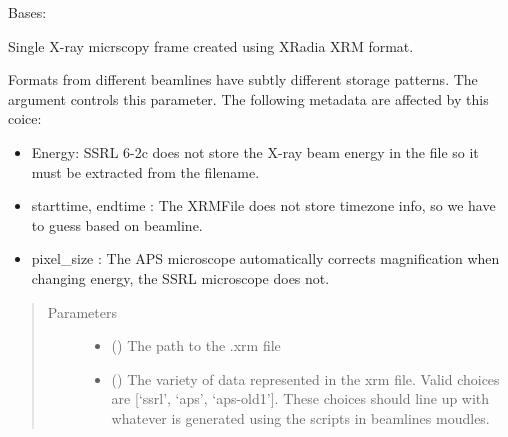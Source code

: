 \documentclass[letterpaper,10pt,english]{sphinxmanual}
\begin{document}
\begin{fulllineitems}
\label{\detokenize{xanespy:xanespy.xradia.XRMFile}}
Bases: 

Single X-ray micrscopy frame created using XRadia XRM format.

Formats from different beamlines have subtly different storage
patterns. The  argument controls this parameter. The
following metadata are affected by this coice:
\begin{itemize}
\item {} 
Energy: SSRL 6-2c does not store the X-ray beam energy in the
file so it must be extracted from the filename.

\item {} 
starttime, endtime : The XRMFile does not store timezone info,
so we have to guess based on beamline.

\item {} 
pixel\_size : The APS microscope automatically corrects
magnification when changing energy, the SSRL microscope does
not.

\end{itemize}
\begin{quote}\begin{description}
\item[{Parameters}] \leavevmode\begin{itemize}
\item {} 
 () \textendash{} The path to the .xrm file

\item {} 
 () \textendash{} The variety of data represented in the xrm file. Valid
choices are {[}‘ssrl’, ‘aps’, ‘aps-old1’{]}. These choices should
line up with whatever is generated using the scripts in
beamlines moudles.

\end{itemize}

\end{description}\end{quote}

\begin{fulllineitems}
\label{\detokenize{xanespy:xanespy.xradia.XRMFile.aps_old1_regex}}
\end{fulllineitems}


\end{fulllineitems}
\end{document}
